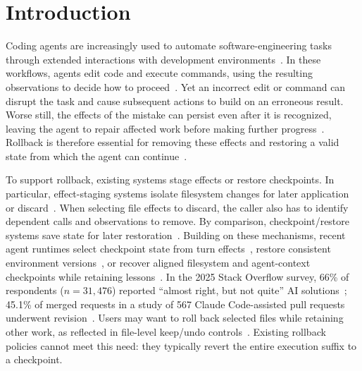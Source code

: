 \section{Introduction}

Coding agents are increasingly used to automate software-engineering tasks
through extended interactions with development
environments~\cite{sweagent,openhands,autocoderover,hyperagent}. In these
workflows, agents edit code and execute commands, using the resulting
observations to decide how to proceed~\cite{react,toolformer}. Yet an
incorrect edit or command can disrupt the task and cause subsequent actions
to build on an erroneous result. Worse still, the effects of the mistake can
persist even after it is recognized, leaving the agent to repair affected work
before making further progress~\cite{agentrewind,planarian}. Rollback is
therefore essential for removing these effects and restoring a valid state
from which the agent can continue~\cite{try-osdi26,branchfs,crab}.

To support rollback, existing systems stage effects or restore checkpoints.
In particular, effect-staging systems isolate filesystem changes for later
application or discard~\cite{try-osdi26,branchfs,cordon}. When selecting
file effects to discard, the caller also has to identify dependent calls
and observations to remove. By comparison, checkpoint/restore systems save state for later
restoration~\cite{rollbacksurvey,dmtcp,waypoint,deltabox}. Building on
these mechanisms, recent agent runtimes select checkpoint state from turn effects~\cite{crab}, restore
consistent environment versions~\cite{planarian}, or recover aligned
filesystem and agent-context checkpoints while retaining lessons~\cite{agentrewind}.
In the 2025 Stack Overflow survey, 66\% of respondents ($n=31{,}476$)
reported ``almost right, but not quite'' AI solutions~\cite{stackoverflow-survey-2025};
45.1\% of merged requests in a study of 567 Claude Code-assisted pull
requests underwent revision~\cite{watanabe-agentic-prs}.
Users may want to roll back selected files while retaining other work,
as reflected in file-level keep/undo controls~\cite{vscode-review-edits}.
Existing rollback policies cannot meet this need: they typically revert
the entire execution suffix to a checkpoint.

